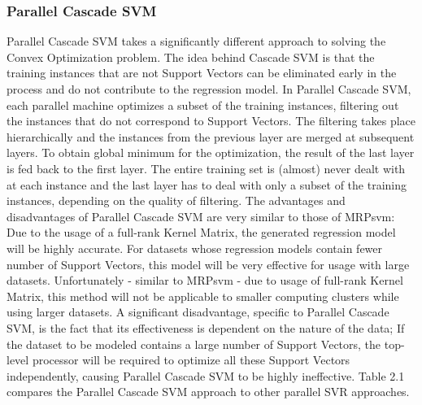 \documentclass[12pt]{article}
\begin{document}
\subsubsection{Parallel Cascade SVM}
Parallel Cascade SVM takes a significantly different approach to solving the Convex Optimization problem. The idea behind Cascade SVM is that the training instances that are not Support Vectors can be eliminated early in the process and do not contribute to the regression model. In Parallel Cascade SVM, each parallel machine optimizes a subset of the training instances, filtering out the instances that do not correspond to Support Vectors. The filtering takes place hierarchically and the instances from the previous layer are merged at subsequent layers. To obtain global minimum for the optimization, the result of the last layer is fed back to the first layer. The entire training set is (almost) never dealt with at each instance and the last layer has to deal with only a subset of the training instances, depending on the quality of filtering.
\newline\newline
The advantages and disadvantages of Parallel Cascade SVM are very similar to those of MRPsvm: Due to the usage of a full-rank Kernel Matrix, the generated regression model will be highly accurate. For datasets whose regression models contain fewer number of Support Vectors, this model will be very effective for usage with large datasets.\newline
Unfortunately - similar to MRPsvm - due to usage of full-rank Kernel Matrix, this method will not be applicable to smaller computing clusters while using larger datasets. A significant disadvantage, specific to Parallel Cascade SVM, is the fact that its effectiveness is dependent on the nature of the data; If the dataset to be modeled contains a large number of Support Vectors, the top-level processor will be required to optimize all these Support Vectors independently, causing Parallel Cascade SVM to be highly ineffective.
\newline\newline
Table 2.1 compares the Parallel Cascade SVM approach to other parallel SVR approaches.
\end{document}
